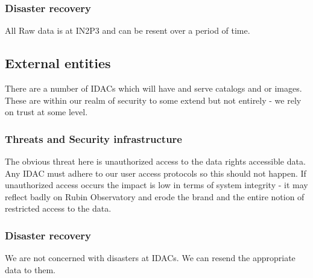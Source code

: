 \subsubsection{Disaster recovery}
All Raw data is at IN2P3 and can be resent over a period of time.


\subsection{External entities}
There are a number of \gls{IDAC}s which will have and serve catalogs and or images.
These are within our realm of security to some extend but not entirely - we rely on trust at some level.
\subsubsection{Threats and Security infrastructure}
The obvious threat here is unauthorized access to the data rights accessible data.
Any IDAC must adhere to our user access protocols so this should not happen.
If unauthorized access occurs the impact is low in terms of system integrity - it may reflect badly on Rubin Observatory and erode the brand and the entire notion of restricted access to the data.

\subsubsection{Disaster recovery}
We are not concerned with disasters at IDACs.
We can resend the appropriate data to them.
